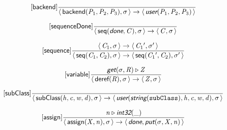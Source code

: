\documentclass[10pt,leqno]{article}
\newcommand{\artVariable}[1]{\mbox{\em #1\/}}
\newcommand{\artConstructor}[1]{\mbox{\sf #1}}
\newcommand{\artCaseInsensitiveLiteral}[1]{\mbox{\tt #1}}
\newcommand{\artSpecial}[1]{\mbox{\sf\em #1}}
\begin{document}
\begin{equation}
\tag*{[\artConstructor{\sf backend}]}\frac{}{\langle\, \artConstructor{\sf backend}(\artVariable{P$_{1}$}, \artVariable{P$_{2}$}, \artVariable{P$_{3}$}), \artVariable{$\sigma$}\,\rangle \rightarrow \langle\, \artSpecial{user}(\artVariable{P$_{1}$}, \artVariable{P$_{2}$}, \artVariable{P$_{3}$})\,\rangle }
\end{equation}

\begin{equation}
\tag*{[\artConstructor{\sf sequenceDone}]}\frac{}{\langle\, \artConstructor{\sf seq}(\artSpecial{done}, \artVariable{C}), \artVariable{$\sigma$}\,\rangle \rightarrow \langle\, \artVariable{C}, \artVariable{$\sigma$}\,\rangle }
\end{equation}

\begin{equation}
\tag*{[\artConstructor{\sf sequence}]}\frac{\langle\, \artVariable{C$_{1}$}, \artVariable{$\sigma$}\,\rangle \rightarrow \langle\, \artVariable{C$_{1}$\/$^\prime$}, \artVariable{$\sigma$\/$^\prime$}\,\rangle }{\langle\, \artConstructor{\sf seq}(\artVariable{C$_{1}$}, \artVariable{C$_{2}$}), \artVariable{$\sigma$}\,\rangle \rightarrow \langle\, \artConstructor{\sf seq}(\artVariable{C$_{1}$\/$^\prime$}, \artVariable{C$_{2}$}), \artVariable{$\sigma$\/$^\prime$}\,\rangle }
\end{equation}

\begin{equation}
\tag*{[\artConstructor{\sf variable}]}\frac{ \artSpecial{get}(\artVariable{$\sigma$}, \artVariable{R})\triangleright \artVariable{Z} }{\langle\, \artConstructor{\sf deref}(\artVariable{R}), \artVariable{$\sigma$}\,\rangle \rightarrow \langle\, \artVariable{Z}, \artVariable{$\sigma$}\,\rangle }
\end{equation}

\begin{equation}
\tag*{[\artConstructor{\sf subClass}]}\frac{}{\langle\, \artConstructor{\sf subClass}(\artVariable{h}, \artVariable{c}, \artVariable{w}, \artVariable{d}), \artVariable{$\sigma$}\,\rangle \rightarrow \langle\, \artSpecial{user}(\artSpecial{string}(\artCaseInsensitiveLiteral{subClass}), \artVariable{h}, \artVariable{c}, \artVariable{w}, \artVariable{d}), \artVariable{$\sigma$}\,\rangle }
\end{equation}

\begin{equation}
\tag*{[\artConstructor{\sf assign}]}\frac{ \artVariable{n}\triangleright \artSpecial{int32}(\_) }{\langle\, \artConstructor{\sf assign}(\artVariable{X}, \artVariable{n}), \artVariable{$\sigma$}\,\rangle \rightarrow \langle\, \artSpecial{done}, \artSpecial{put}(\artVariable{$\sigma$}, \artVariable{X}, \artVariable{n})\,\rangle }
\end{equation}
\end{document}
